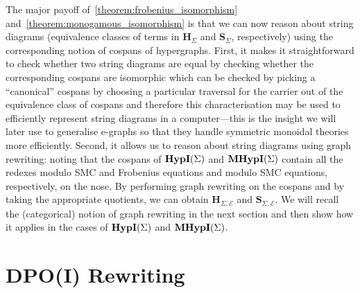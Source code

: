 The major payoff of~\cref{theorem:frobenius_isomorphism} and~\cref{theorem:monogamous_isomorphism} is that we can now reason about string diagrams (equivalence classes of terms in $\mathbf{H}_{\Sigma}$ and $\mathbf{S}_{\Sigma}$, respectively) using the corresponding notion of cospans of hypergraphs.
First, it makes it straightforward to check whether two string diagrams are equal by checking whether the corresponding cospans are isomorphic which can be checked by picking a \enquote{canonical} cospans by choosing a particular traversal for the carrier out of the equivalence class of cospans and therefore this characterisation may be used to efficiently represent string diagrams in a computer---this is the insight we will later use to generalise e-graphs so that they handle symmetric monoidal theories more efficiently.
Second, it allows us to reason about string diagrams using graph rewriting: noting that the cospans of $\mathbf{HypI}(\Sigma)$ and $\mathbf{MHypI}(\Sigma)$ contain all the redexes modulo SMC and Frobenius equations and modulo SMC equations, respectively, on the nose.
By performing graph rewriting on the cospans and by taking the appropriate quotients, we can obtain $\mathbf{H}_{\Sigma, \mathcal{E}}$ and $\mathbf{S}_{\Sigma, \mathcal{E}}$.
We will recall the (categorical) notion of graph rewriting in the next section and then show how it applies in the cases of $\mathbf{HypI}(\Sigma)$ and $\mathbf{MHypI}(\Sigma)$.

\section{DPO(I) Rewriting}\label{sec:dpo_rewriting}

